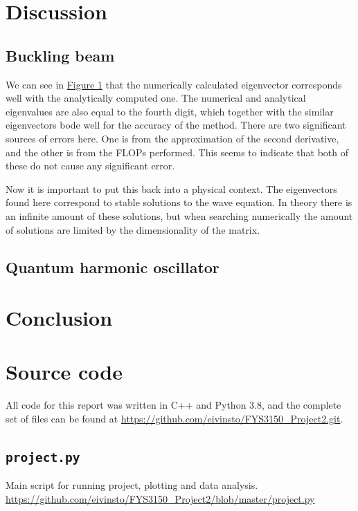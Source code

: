 \documentclass[reprint,english,notitlepage]{revtex4-1}  %
\begin{document}
\newpage

\section{Discussion} \label{sec:V} 

\subsection{Buckling beam} \label{sec:V:a}

We can see in \hyperref[fig:IV:a:1]{Figure 1} that the numerically calculated eigenvector corresponds well with the analytically computed one. The numerical and analytical eigenvalues are also equal to the fourth digit, which together with the similar eigenvectors bode well for the accuracy of the method. There are two significant sources of errors here. One is from the approximation of the second derivative, and the other is from the FLOPs performed. This seems to indicate that both of these do not cause any significant error. 

Now it is important to put this back into a physical context. The eigenvectors found here correspond to stable solutions to the wave equation. In theory there is an infinite amount of these solutions, but when searching numerically the amount of solutions are limited by the dimensionality of the matrix. 


\subsection{Quantum harmonic oscillator} \label{sec:V:b}

\section{Conclusion} \label{sec:VI}


{}

\appendix
\section{Source code} \label{A}
All code for this report was written in C++ and Python 3.8, and the complete set of files can be found at \url{https://github.com/eivinsto/FYS3150_Project2.git}.

\cprotect\subsection{\verb+project.py+} \label{A.1}
Main script for running project, plotting and data analysis.
\url{https://github.com/eivinsto/FYS3150_Project2/blob/master/project.py}
\end{document}
